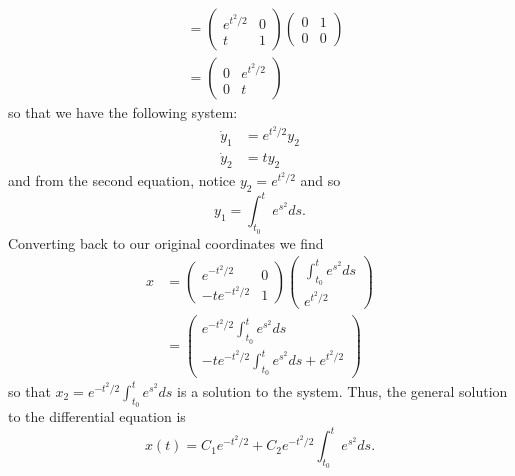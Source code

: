 \documentclass{article}
\begin{document}
\begin{itemize}
\begin{align*}
        &= \begin{pmatrix}
            e^{t^2/2} & 0\\
            t & 1
        \end{pmatrix}\begin{pmatrix}
            0 & 1\\
            0 & 0
        \end{pmatrix}\\
        & = \begin{pmatrix}
            0 & e^{t^2/2}\\
            0 & t
        \end{pmatrix}
    \end{align*}
    so that we have the following system:
    \begin{align*}
        \dot{y}_1 &= e^{t^2/2}y_2\\
        \dot{y}_2 &= ty_2
    \end{align*}
    and from the second equation, notice $y_2 = e^{t^2/2}$ and so 
    \[y_1 = \int_{t_0}^t e^{s^2}ds.\]
    Converting back to our original coordinates we find
    \begin{align*}
        x &= \begin{pmatrix}
            e^{-t^2/2} & 0\\
            -te^{-t^2/2} & 1
        \end{pmatrix}\begin{pmatrix}
            \int_{t_0}^t e^{s^2}ds\\
            e^{t^2/2}
        \end{pmatrix}\\
        &= \begin{pmatrix}
            e^{-t^2/2}\int_{t_0}^te^{s^2}ds\\
            -te^{-t^2/2}\int_{t_0}^te^{s^2}ds + e^{t^2/2}
        \end{pmatrix}
    \end{align*}
    so that $x_2 = e^{-t^2/2}\int_{t_0}^te^{s^2}ds$ is a solution to the system. Thus, the general solution to the differential equation is
    \[x(t) = C_1e^{-t^2/2} + C_2e^{-t^2/2}\int_{t_0}^te^{s^2}ds.\]
\end{itemize}

\pagebreak
\end{document}
